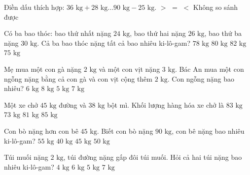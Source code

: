 \begin{ex} %
Điền dấu thích hợp: $36\text{ kg} + 28\text{ kg} \dots 90\text{ kg} - 25\text{ kg}$.
\choice
{$>$}
{$=$}
{\True $<$}
{Không so sánh được}
\end{ex}

\begin{ex} %
Có ba bao thóc: bao thứ nhất nặng $24\text{ kg}$, bao thứ hai nặng $26\text{ kg}$, bao thứ ba nặng $30\text{ kg}$. Cả ba bao thóc nặng tất cả bao nhiêu ki-lô-gam?
\choice
{$78\text{ kg}$}
{\True $80\text{ kg}$}
{$82\text{ kg}$}
{$75\text{ kg}$}
\end{ex}

\begin{ex} %
Mẹ mua một con gà nặng $2\text{ kg}$ và một con vịt nặng $3\text{ kg}$. Bác An mua một con ngỗng nặng bằng cả con gà và con vịt cộng thêm $2\text{ kg}$. Con ngỗng nặng bao nhiêu?
\choice
{$6\text{ kg}$}
{$8\text{ kg}$}
{$5\text{ kg}$}
{\True $7\text{ kg}$}
\end{ex}

\begin{ex} %
Một xe chở $45\text{ kg}$ đường và $38\text{ kg}$ bột mì. Khối lượng hàng hóa xe chở là
\choice
{\True $83\text{ kg}$}
{$73\text{ kg}$}
{$81\text{ kg}$}
{$85\text{ kg}$}
\end{ex}

\begin{ex} %
Con bò nặng hơn con bê $45\text{ kg}$. Biết con bò nặng $90\text{ kg}$, con bê nặng bao nhiêu ki-lô-gam?
\choice
{$55\text{ kg}$}
{$40\text{ kg}$}
{\True $45\text{ kg}$}
{$50\text{ kg}$}
\end{ex}

\begin{ex} %
Túi muối nặng $2\text{ kg}$, túi đường nặng gấp đôi túi muối. Hỏi cả hai túi nặng bao nhiêu ki-lô-gam?
\choice
{$4\text{ kg}$}
{\True $6\text{ kg}$}
{$5\text{ kg}$}
{$7\text{ kg}$}
\end{ex}

